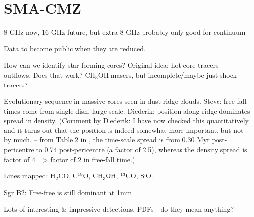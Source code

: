 \section{SMA-CMZ}
8 GHz now, 16 GHz future, but extra 8 GHz probably only good for continuum

Data to become public when they are reduced.

How can we identify star forming cores?  Original idea: hot core tracers + outflows.  Does that work? CH$_3$OH masers, but incomplete/maybe just shock tracers?

Evolutionary sequence in massive cores seen in dust ridge clouds.  Steve: free-fall times come from single-dish, large scale.  Diederik: position along ridge dominates spread in density. (Comment by Diederik: I have now checked this quantitatively and it turns out that the position is indeed somewhat more important, but not by much. -- from Table 2 in \citet{Kruijssen2015a}, the time-scale spread is from 0.30 Myr post-pericentre to 0.74 post-pericentre (a factor of 2.5), whereas the density spread is factor of 4 => factor of 2 in free-fall time.)

Lines mapped: H$_2$CO, C$^{18}$O, CH$_3$OH, $^{13}$CO, SiO.

Sgr B2: Free-free is still dominant at 1mm

Lots of interesting & impressive detections.  PDFs - do they mean anything?